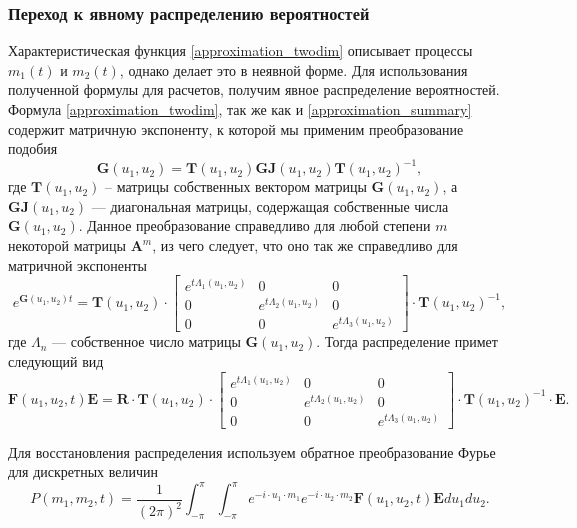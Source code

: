 \subsubsection{Переход к явному распределению вероятностей} \label{distr_find_twodim}
Характеристическая функция \eqref{approximation_twodim} описывает процессы $m_{1}(t)$ и $m_{2}(t)$, однако делает это в неявной форме. Для использования полученной формулы для расчетов, получим явное распределение вероятностей.
Формула \eqref{approximation_twodim}, так же как и \eqref{approximation_summary} содержит матричную экспоненту, к которой мы применим преобразование подобия \cite{bronson1991matrix}
\begin{equation*}
	\boldsymbol{G}(u_{1},u_{2}) =\boldsymbol{T}(u_{1},u_{2})\boldsymbol{GJ}(u_{1},u_{2})\boldsymbol{T}(u_{1},u_{2})^{-1},
\end{equation*}
где $\boldsymbol{T}(u_{1},u_{2})$ – матрицы собственных вектором матрицы $\boldsymbol{G}(u_{1},u_{2})$, а $\boldsymbol{GJ}(u_{1},u_{2})$ --- диагональная матрицы, содержащая собственные числа $\boldsymbol{G}(u_{1},u_{2})$. Данное преобразование справедливо для любой степени $m$ некоторой матрицы $\boldsymbol{A}^{m}$, из чего следует, что оно так же справедливо для матричной экспоненты \cite{egorov2006prog}
\begin{equation*}
	e^{\boldsymbol{G}(u_{1},u_{2})t}=\boldsymbol{T}(u_{1},u_{2})\cdot \begin{bmatrix}
		e^{t \Lambda_{1}(u_{1},u_{2})} & 0 &  0\\
		0 & e^{t \Lambda_{2}(u_{1},u_{2})} & 0\\
		0 & 0 &	e^{t \Lambda_{3}(u_{1},u_{2})}
	\end{bmatrix} \cdot \boldsymbol{T}(u_{1},u_{2})^{-1},
\end{equation*}
где $\Lambda_{n}$ --- собственное число матрицы $\boldsymbol{G}(u_{1},u_{2})$. Тогда распределение примет следующий вид
\begin{equation*}
	\boldsymbol{F}(u_{1},u_{2},t)\boldsymbol{E}=\boldsymbol{R} \cdot \boldsymbol{T}(u_{1},u_{2})\cdot \begin{bmatrix}
		e^{t \Lambda_{1}(u_{1},u_{2})} & 0 &  0\\
		0 & e^{t \Lambda_{2}(u_{1},u_{2})} & 0\\
		0 & 0 &	e^{t \Lambda_{3}(u_{1},u_{2})}
	\end{bmatrix} \cdot \boldsymbol{T}(u_{1},u_{2})^{-1} \cdot \boldsymbol{E}.
\end{equation*}

Для восстановления распределения используем обратное преобразование Фурье для дискретных величин
\begin{equation} \label{distr_simple_twodim}
	P(m_{1},m_{2},t) = \dfrac{1}{(2\pi)^2}\int_{-\pi}^{\pi}\int_{-\pi}^{\pi} e^{-i \cdot u_{1} \cdot m_{1}} e^{-i \cdot u_{2} \cdot m_{2}}\boldsymbol{F}(u_{1},u_{2},t)\boldsymbol{E}du_{1}du_{2}.
\end{equation}

